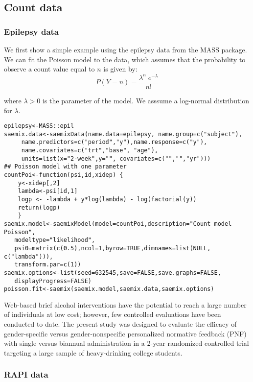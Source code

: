 \subsection{Count data} 

\subsubsection{Epilepsy data} \label{sec:epilepsyCount}

We first show a simple example using the {\sf epilepsy} data from the {\sf MASS} package. We can fit the Poisson model to the data, which assumes that the probability to observe a count value equal to $n$ is given by:
\begin{equation}
P(Y=n) = \frac{\lambda^n \; e^{-\lambda}}{n!}
\end{equation}

where $\lambda>0$ is the parameter of the model. We asssume a log-normal distribution for $\lambda$.

\begin{verbatim}
epilepsy<-MASS::epil
saemix.data<-saemixData(name.data=epilepsy, name.group=c("subject"),
     name.predictors=c("period","y"),name.response=c("y"),
     name.covariates=c("trt","base", "age"), 
     units=list(x="2-week",y="", covariates=c("","","yr")))
## Poisson model with one parameter
countPoi<-function(psi,id,xidep) { 
    y<-xidep[,2]
    lambda<-psi[id,1]
    logp <- -lambda + y*log(lambda) - log(factorial(y))
    return(logp)
    }
saemix.model<-saemixModel(model=countPoi,description="Count model Poisson",
   modeltype="likelihood", 
   psi0=matrix(c(0.5),ncol=1,byrow=TRUE,dimnames=list(NULL, c("lambda"))), 
   transform.par=c(1))
saemix.options<-list(seed=632545,save=FALSE,save.graphs=FALSE, 
   displayProgress=FALSE)
poisson.fit<-saemix(saemix.model,saemix.data,saemix.options)
\end{verbatim}

Web-based brief alcohol interventions have the potential to reach a large number of individuals at low cost; however, few controlled evaluations have been conducted to date. The present study was designed to evaluate the efficacy of gender-specific versus gender-nonspecific personalized normative feedback (PNF) with single versus biannual administration in a 2-year randomized controlled trial targeting a large sample of heavy-drinking college students.

\subsubsection{RAPI data} \label{sec:RAPICount}

